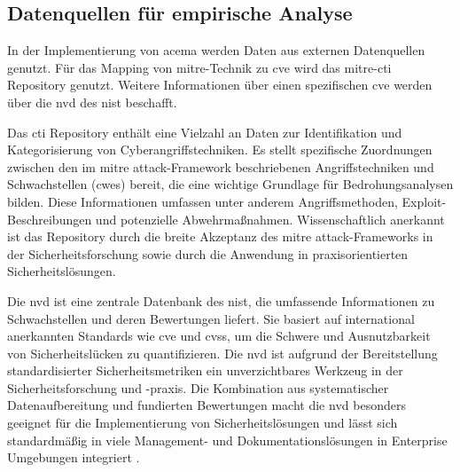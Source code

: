 \subsection{Datenquellen für empirische Analyse}
\par In der Implementierung von \gls{acema} werden Daten aus externen Datenquellen genutzt. Für das Mapping von \gls{mitre}-Technik zu \gls{cve} wird das \gls{mitre}-\gls{cti} Repository genutzt. Weitere Informationen über einen spezifischen \gls{cve} werden über die \gls{nvd} des \gls{nist} beschafft.
\par Das \gls{cti} Repository enthält eine Vielzahl an Daten zur Identifikation und Kategorisierung von Cyberangriffstechniken. Es stellt spezifische Zuordnungen zwischen den im \gls{mitre} \gls{attack}-Framework beschriebenen Angriffstechniken und Schwachstellen (\glspl{cwe}) bereit, die eine wichtige Grundlage für Bedrohungsanalysen bilden. Diese Informationen umfassen unter anderem Angriffsmethoden, Exploit-Beschreibungen und potenzielle Abwehrmaßnahmen. Wissenschaftlich anerkannt ist das Repository durch die breite Akzeptanz des \gls{mitre} \gls{attack}-Frameworks in der Sicherheitsforschung sowie durch die Anwendung in praxisorientierten Sicherheitslösungen.
\par Die \gls{nvd} ist eine zentrale Datenbank des \gls{nist}, die umfassende Informationen zu Schwachstellen und deren Bewertungen liefert. Sie basiert auf international anerkannten Standards wie \gls{cve} und \gls{cvss}, um die Schwere und Ausnutzbarkeit von Sicherheitslücken zu quantifizieren. Die \gls{nvd} ist aufgrund der Bereitstellung standardisierter Sicherheitsmetriken ein unverzichtbares Werkzeug in der Sicherheitsforschung und -praxis. Die Kombination aus systematischer Datenaufbereitung und fundierten Bewertungen macht die \gls{nvd} besonders geeignet für die Implementierung von Sicherheitslösungen und lässt sich standardmäßig in viele Management- und Dokumentationslösungen in Enterprise Umgebungen integriert \autocite{AssetsNVDIntegration,InformationenNVDIntegrationen}.